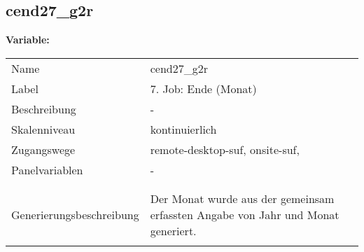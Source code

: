 	
	
	\subsection{cend27\_g2r}
	\label{subSection:cend27_g2r}

	\noindent\textbf{Variable:}\\
		\begin{tabular}{lL{11.3cm}}
			\label{tableVariable:cend27_g2r}
			Name & cend27\_g2r \\
			Label & 7. Job: Ende (Monat) \\
			Beschreibung & - \\
			Skalenniveau & kontinuierlich \\
			Zugangswege &
				remote-desktop-suf,
				onsite-suf,
 \\
			Panelvariablen & -
			 \\
			 \\
 \\
					Generierungsbeschreibung & Der Monat wurde aus der gemeinsam erfassten Angabe von Jahr und Monat generiert. 
				 \\	
			 \\
		\end{tabular}





